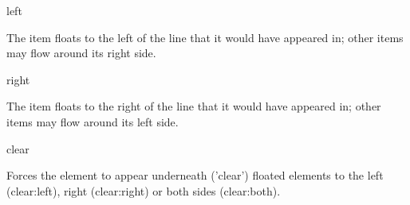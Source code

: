 \begin{compactitem}
\item left

The item floats to the left of the line that it would have appeared in; other items may flow around its right side.

\item right

The item floats to the right of the line that it would have appeared in; other items may flow around its left side.

\item clear

Forces the element to appear underneath ('clear') floated elements to the left (clear:left), right (clear:right) or both sides (clear:both).


\end{compactitem}

































































